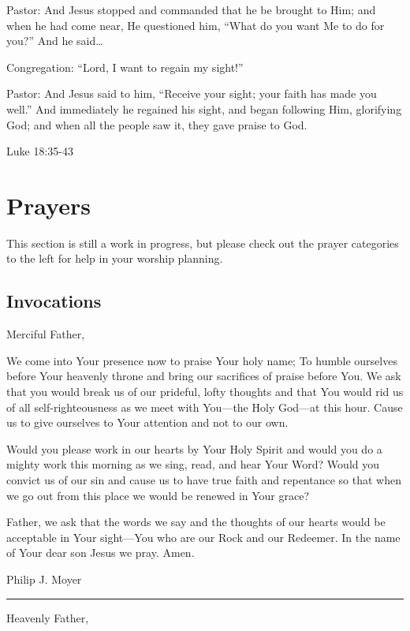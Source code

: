 \documentclass[]{book}
\begin{document}
Pastor: And Jesus stopped and commanded that he be brought to Him; and
when he had come near, He questioned him, ``What do you want Me to do
for you?'' And he said\ldots{}

Congregation: ``Lord, I want to regain my sight!''

Pastor: And Jesus said to him, ``Receive your sight; your faith has made
you well.'' And immediately he regained his sight, and began following
Him, glorifying God; and when all the people saw it, they gave praise to
God.

Luke 18:35-43 \textbar{}

\chapter{Prayers}\label{prayers}

This section is still a work in progress, but please check out the
prayer categories to the left for help in your worship planning.

\section{Invocations}\label{invocations}

Merciful Father,

We come into Your presence now to praise Your holy name; To humble
ourselves before Your heavenly throne and bring our sacrifices of praise
before You. We ask that you would break us of our prideful, lofty
thoughts and that You would rid us of all self-righteousness as we meet
with You---the Holy God---at this hour. Cause us to give ourselves to
Your attention and not to our own.

Would you please work in our hearts by Your Holy Spirit and would you do
a mighty work this morning as we sing, read, and hear Your Word? Would
you convict us of our sin and cause us to have true faith and repentance
so that when we go out from this place we would be renewed in Your
grace?

Father, we ask that the words we say and the thoughts of our hearts
would be acceptable in Your sight---You who are our Rock and our
Redeemer. In the name of Your dear son Jesus we pray. Amen.

Philip J. Moyer

\begin{center}\rule{0.5\linewidth}{\linethickness}\end{center}

Heavenly Father,
\end{document}

